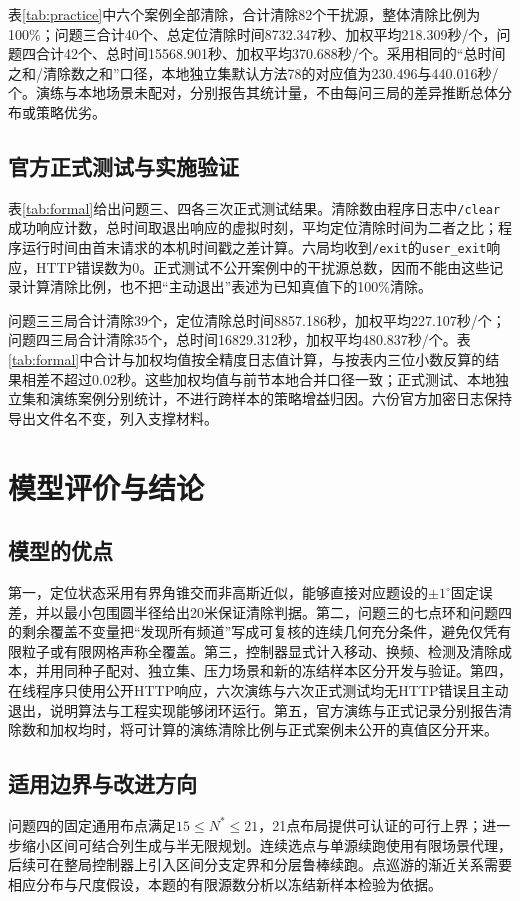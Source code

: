 \documentclass[UTF8,a4paper,zihao=-4,fontset=fandol]{ctexart}
\begin{document}
表\ref{tab:practice}中六个案例全部清除，合计清除82个干扰源，整体清除比例为100\%；问题三合计40个、总定位清除时间8732.347秒、加权平均218.309秒/个，问题四合计42个、总时间15568.901秒、加权平均370.688秒/个。采用相同的“总时间之和/清除数之和”口径，本地独立集默认方法78的对应值为230.496与440.016秒/个。演练与本地场景未配对，分别报告其统计量，不由每问三局的差异推断总体分布或策略优劣。

\subsection{官方正式测试与实施验证}
表\ref{tab:formal}给出问题三、四各三次正式测试结果。清除数由程序日志中\texttt{/clear}成功响应计数，总时间取退出响应的虚拟时刻，平均定位清除时间为二者之比；程序运行时间由首末请求的本机时间戳之差计算。六局均收到\texttt{/exit}的\texttt{user\_exit}响应，HTTP错误数为0。正式测试不公开案例中的干扰源总数，因而不能由这些记录计算清除比例，也不把“主动退出”表述为已知真值下的100\%清除。

问题三三局合计清除39个，定位清除总时间8857.186秒，加权平均227.107秒/个；问题四三局合计清除35个，总时间16829.312秒，加权平均480.837秒/个。表\ref{tab:formal}中合计与加权均值按全精度日志值计算，与按表内三位小数反算的结果相差不超过0.02秒。这些加权均值与前节本地合并口径一致；正式测试、本地独立集和演练案例分别统计，不进行跨样本的策略增益归因。六份官方加密日志保持导出文件名不变，列入支撑材料。

\section{模型评价与结论}
\subsection{模型的优点}
第一，定位状态采用有界角锥交而非高斯近似，能够直接对应题设的$\pm1^\circ$固定误差，并以最小包围圆半径给出20米保证清除判据。第二，问题三的七点环和问题四的剩余覆盖不变量把“发现所有频道”写成可复核的连续几何充分条件，避免仅凭有限粒子或有限网格声称全覆盖。第三，控制器显式计入移动、换频、检测及清除成本，并用同种子配对、独立集、压力场景和新的冻结样本区分开发与验证。第四，在线程序只使用公开HTTP响应，六次演练与六次正式测试均无HTTP错误且主动退出，说明算法与工程实现能够闭环运行。第五，官方演练与正式记录分别报告清除数和加权均时，将可计算的演练清除比例与正式案例未公开的真值区分开来。

\subsection{适用边界与改进方向}
问题四的固定通用布点满足$15\le N^*\le21$，21点布局提供可认证的可行上界；进一步缩小区间可结合列生成与半无限规划。连续选点与单源续跑使用有限场景代理，后续可在整局控制器上引入区间分支定界和分层鲁棒续跑。点巡游的渐近关系需要相应分布与尺度假设，本题的有限源数分析以冻结新样本检验为依据。
\end{document}
